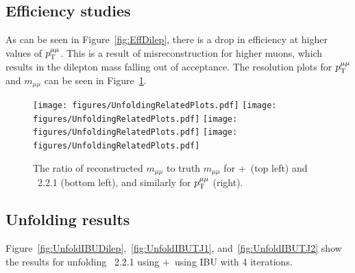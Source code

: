 \subsection{Efficiency studies}

As can be seen in Figure~\ref{fig:EffDilep}, there is a drop in efficiency at higher values of $p_\mathrm{T}^{\mu\mu}$. This is a result of \pt misreconstruction for higher \pt muons, which results in the dilepton mass falling out of acceptance.
The resolution plots for $p_\mathrm{T}^{\mu\mu}$ and $m_{\mu\mu}$ can be seen in Figure~\ref{fig:Resmll}.

\begin{figure}
  \centering
  \texttt{[image: figures/UnfoldingRelatedPlots.pdf]}
  \texttt{[image: figures/UnfoldingRelatedPlots.pdf]}
  \texttt{[image: figures/UnfoldingRelatedPlots.pdf]}
  \texttt{[image: figures/UnfoldingRelatedPlots.pdf]}
  \caption{The ratio of reconstructed $m_{\mu\mu}$ to truth $m_{\mu\mu}$ for \powheg+\pythia~(top left) and \sherpa~2.2.1 (bottom left), and similarly for $p_\mathrm{T}^{\mu\mu}$ (right).}
  \label{fig:Resmll}
\end{figure}

\subsection{Unfolding results}
Figure~\ref{fig:UnfoldIBUDilep},~\ref{fig:UnfoldIBUTJ1}, and~\ref{fig:UnfoldIBUTJ2} show the results for unfolding \sherpa~2.2.1 using \powheg+\pythia~using IBU with 4 iterations.

